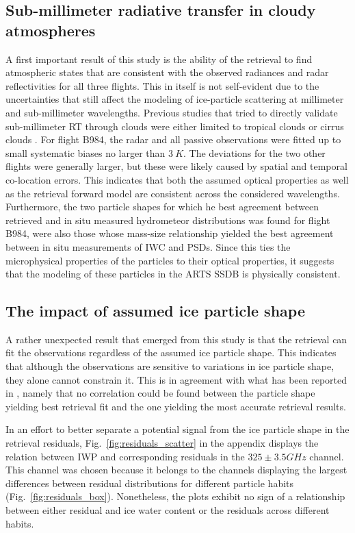 \documentclass[journal abbreviation, manuscript]{copernicus}
\begin{document}
\subsection{Sub-millimeter radiative transfer in cloudy atmospheres}

 A first important result of this study is the ability of the retrieval to find
 atmospheric states that are consistent with the observed radiances and radar
 reflectivities for all three flights. This in itself is not self-evident due to
 the uncertainties that still affect the modeling of ice-particle scattering at
 millimeter and sub-millimeter wavelengths. Previous studies that tried to
 directly validate sub-millimeter RT through clouds were either limited to
 tropical clouds \citep{evans05, eriksson07} or cirrus clouds \citep{fox17}. For
 flight B984, the radar and all passive observations were fitted up to small
 systematic biases no larger than $3\ \unit{K}$. The deviations for the two
 other flights were generally larger, but these were likely caused by spatial
 and temporal co-location errors. This indicates that both the assumed optical
 properties as well as the retrieval forward model are consistent across the
 considered wavelengths. Furthermore, the two particle shapes for which he best
 agreement between retrieved and in situ measured hydrometeor distributions was
 found for flight B984, were also those whose mass-size relationship yielded the
 best agreement between in situ measurements of IWC and PSDs. Since this ties
 the microphysical properties of the particles to their optical properties, it
 suggests that the modeling of these particles in the ARTS SSDB is physically
 consistent.

\subsection{The impact of assumed ice particle shape}

A rather unexpected result that emerged from this study is that the retrieval
can fit the observations regardless of the assumed ice particle shape. This
indicates that although the observations are sensitive to variations in ice
particle shape, they alone cannot constrain it. This is in agreement with what
has been reported in \citet{pfreundschuh20}, namely that no correlation could be
found between the particle shape yielding best retrieval fit and the one
yielding the most accurate retrieval results.

In an effort to better separate a potential signal from the ice particle shape
in the retrieval residuals, Fig.~\ref{fig:residuals_scatter} in the appendix
displays the relation between IWP and corresponding residuals in the $325 \pm
3.5 \unit{GHz}$ channel. This channel was chosen because it belongs to the
channels displaying the largest differences between residual distributions for
different particle habits (Fig.~\ref{fig:residuals_box}). Nonetheless, the
plots exhibit no sign of a relationship between either residual and ice
water content or the residuals across different habits.
\end{document}
